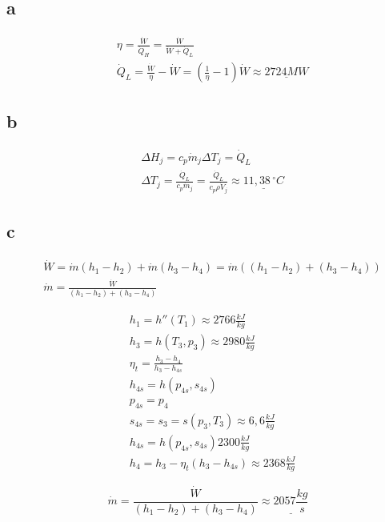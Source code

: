 \documentclass[12pt,a4paper,finnish]{article}
\begin{document}
\subsection{a}

\begin{align}
 &\eta = \frac{\dot{W}}{\dot{Q}_H} = \frac{\dot{W}}{\dot{W} + \dot{Q}_L}\\
 &\dot{Q}_L = \frac{\dot{W}}{\eta} - \dot{W} = \left(\frac{1}{\eta} - 1\right)\dot{W} \approx \underline{2724 MW}
\end{align}

\subsection{b}

\begin{align}
 &\Delta H_j = c_p\dot{m}_j\Delta T_j = \dot{Q}_L\\
 &\Delta T_j = \frac{\dot{Q}_L}{c_p\dot{m}_j} = \frac{\dot{Q}_L}{c_p\rho \dot{V}_j} \approx \underline{11,38 \,^{\circ}C}
\end{align}

\subsection{c}

\begin{align}
 &\dot{W} = \dot{m}(h_1 - h_2) + \dot{m}(h_3 - h_4) = \dot{m}((h_1 - h_2) + (h_3 - h_4))\\
 &\dot{m} = \frac{\dot{W}}{(h_1 - h_2) + (h_3 - h_4)}
\end{align}

\begin{align}
 &h_1 = h''(T_1) \approx 2766 \frac{kJ}{kg}\\
 &h_3 = h(T_3, p_3) \approx 2980 \frac{kJ}{kg}\\
 &\eta_t = \frac{h_3 - h_4}{h_3 - h_{4s}}\\
 &h_{4s} = h(p_{4s}, s_{4s})\\
 &p_{4s} = p_4\\
 &s_{4s} = s_3 = s(p_3, T_3) \approx 6,6 \frac{kJ}{kg}\\
 &h_{4s} = h(p_{4s}, s_{4s}) 2300 \frac{kJ}{kg}\\
 &h_4 = h_3 - \eta_t(h_3 - h_{4s}) \approx 2368 \frac{kJ}{kg}
\end{align}

\begin{equation}
 \dot{m} = \frac{\dot{W}}{(h_1 - h_2) + (h_3 - h_4)} \approx \underline{2057 \frac{kg}{s}} 
\end{equation}
\end{document}
